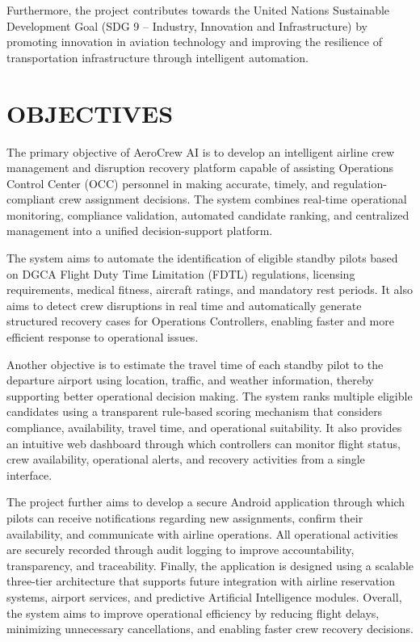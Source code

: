 \documentclass[12pt,a4paper]{report}
\begin{document}
Furthermore, the project contributes towards the United Nations Sustainable Development Goal (SDG 9 -- Industry, Innovation and Infrastructure) by promoting innovation in aviation technology and improving the resilience of transportation infrastructure through intelligent automation.

\section{OBJECTIVES}

The primary objective of AeroCrew AI is to develop an intelligent airline crew management and disruption recovery platform capable of assisting Operations Control Center (OCC) personnel in making accurate, timely, and regulation-compliant crew assignment decisions. The system combines real-time operational monitoring, compliance validation, automated candidate ranking, and centralized management into a unified decision-support platform.

The system aims to automate the identification of eligible standby pilots based on DGCA Flight Duty Time Limitation (FDTL) regulations, licensing requirements, medical fitness, aircraft ratings, and mandatory rest periods. It also aims to detect crew disruptions in real time and automatically generate structured recovery cases for Operations Controllers, enabling faster and more efficient response to operational issues.

Another objective is to estimate the travel time of each standby pilot to the departure airport using location, traffic, and weather information, thereby supporting better operational decision making. The system ranks multiple eligible candidates using a transparent rule-based scoring mechanism that considers compliance, availability, travel time, and operational suitability. It also provides an intuitive web dashboard through which controllers can monitor flight status, crew availability, operational alerts, and recovery activities from a single interface.

The project further aims to develop a secure Android application through which pilots can receive notifications regarding new assignments, confirm their availability, and communicate with airline operations. All operational activities are securely recorded through audit logging to improve accountability, transparency, and traceability. Finally, the application is designed using a scalable three-tier architecture that supports future integration with airline reservation systems, airport services, and predictive Artificial Intelligence modules. Overall, the system aims to improve operational efficiency by reducing flight delays, minimizing unnecessary cancellations, and enabling faster crew recovery decisions.
\end{document}
